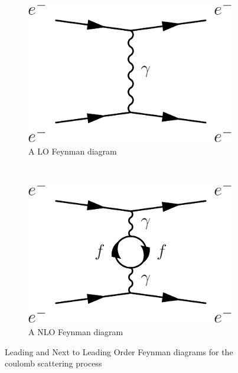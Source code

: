 \begin{figure}
    \centering
    \begin{subfigure}[b]{0.3\textwidth}
        \label{fig:qft_lo_ee_scattering}
        \includegraphics[width=\textwidth]{Figures/Feynman_Diagrams/qft_ex__lo_diagram__coulomb_scattering.pdf}
        \caption{A LO Feynman diagram }
      \end{subfigure}
      ~ %
      \begin{subfigure}[b]{0.3\textwidth}
          \label{fig:qft_nlo_ee_scattering}
          \includegraphics[width=\textwidth]{Figures/Feynman_Diagrams/qft_ex__nlo_diagram__coulomb_scattering.pdf}
          \caption{A NLO Feynman diagram}
      \end{subfigure}
      \caption{Leading and Next to Leading Order Feynman diagrams
        for the coulomb scattering process} \label{fig:feynman_diagrams_ee_scattering}
\end{figure}

